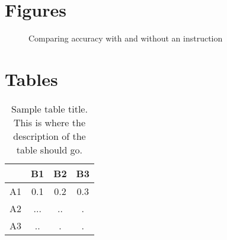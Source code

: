 \documentclass{bmcart}
\begin{document}
\begin{backmatter}




\section*{Figures}

\begin{figure}[h!]
\caption{\label{fig:comparison}Comparing accuracy with and without an instruction}
\end{figure}



\section*{Tables}
\begin{table}[h!]
\caption{Sample table title. This is where the description of the table should go.}
      \begin{tabular}{cccc}
        \hline
           & B1  &B2   & B3\\ \hline
        A1 & 0.1 & 0.2 & 0.3\\
        A2 & ... & ..  & .\\
        A3 & ..  & .   & .\\ \hline
      \end{tabular}
\end{table}




\end{backmatter}
\end{document}
